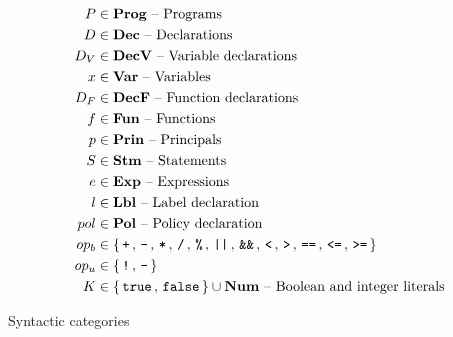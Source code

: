 \begin{table}
  \begin{align*}
    P       & \in \mathbf{Prog} \text{ -- Programs}\\
    D       & \in \mathbf{Dec} \text{ -- Declarations}\\
    D_V     & \in \mathbf{DecV} \text{ -- Variable declarations}\\
    x       & \in \mathbf{Var} \text{ -- Variables}\\
    D_F     & \in \mathbf{DecF} \text{ -- Function declarations}\\
    f       & \in \mathbf{Fun} \text{ -- Functions}\\
    p       & \in \mathbf{Prin} \text{ -- Principals}\\
    S       & \in \mathbf{Stm} \text{ -- Statements}\\
    e       & \in \mathbf{Exp} \text{ -- Expressions}\\
    l       & \in \mathbf{Lbl} \text{ -- Label declaration}\\
    pol     & \in \mathbf{Pol} \text{ -- Policy declaration}\\
    op_b    & \in \{ \, \texttt{+} \, ,  \, \texttt{-} \, ,  \, \texttt{*} \, ,  \, \texttt{/} \, ,  \, \texttt{\%} \, ,  \, \texttt{||} \, ,  \, \texttt{\&\&} \, ,  \, \texttt{<} \, ,  \, \texttt{>} \, ,  \, \texttt{==} \, ,  \, \texttt{<=} \, ,  \, \texttt{>=} \, \} \\
    op_u    & \in \{ \, \texttt{!} \, ,  \, \texttt{-} \, \} \\
    K       & \in \{ \, \texttt{true} \,, \, \texttt{false} \, \} \cup \mathbf{Num} \text{ -- Boolean and integer literals}
  \end{align*}
  \caption{Syntactic categories}
  \label{ctif:categories}
\end{table}

